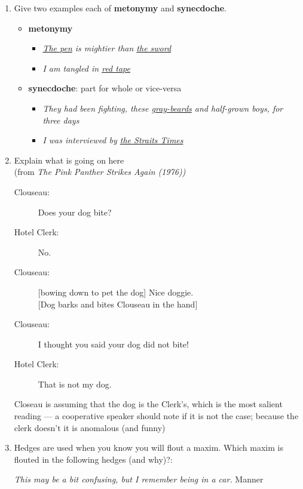 \documentclass[a4paper]{article}
\newcommand{\eng}[1]{\textit{#1}}
\newcommand{\ul}[1]{\uline{#1}}
\begin{document}
\begin{enumerate}
\begin{itemize}
\end{itemize}
\item Give two examples each of \textbf{metonymy} and
  \textbf{synecdoche}.
  \begin{itemize}
  \item \textbf{metonymy}
    \begin{itemize}
    \item \eng{\ul{The pen} is mightier than \ul{the sword}}
    \item \eng{I am tangled in \ul{red tape}}
    \end{itemize}
  \item  \textbf{synecdoche}: part for whole or vice-versa
    \begin{itemize}
    \item \eng{They had been fighting, these \ul{gray-beards} and
        half-grown boys, for three days}
    \item \eng{I was interviewed by \ul{the Straits Times}}
    \end{itemize}
  \end{itemize}
  \newpage
\item Explain what is going on here 
  \\ (from \textit{The Pink Panther Strikes Again (1976))}
  \begin{description}
    \item[Clouseau:] Does your dog bite?
    \item[Hotel Clerk:] No.
    \item[Clouseau:] [bowing down to pet the dog] Nice doggie.
      \\ {}[Dog barks and bites Clouseau in the hand]
    \item[Clouseau:] I thought you said your dog did not bite!
    \item[Hotel Clerk:] That is not my dog. 
    \end{description}
     Closeau is assuming that the dog is the Clerk's, which is the
    most salient reading --- a cooperative speaker should note if it
    is not the case; because the clerk doesn't it is anomalous (and funny)
    

\item Hedges are used when you know you will flout a maxim.  Which
  maxim is flouted in the following hedges (and why)?:

\begin{exe}
\ex \textit{This may be a bit confusing, but I remember being in a car.}
\hfill Manner


\end{exe}
\end{enumerate}
\end{document}
